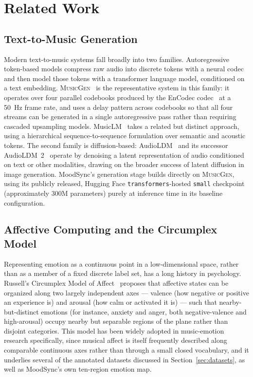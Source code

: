 \documentclass[11pt]{article}
\newcommand{\musicgen}{\textsc{MusicGen}}
\begin{document}
\section{Related Work}

\subsection{Text-to-Music Generation}

Modern text-to-music systems fall broadly into two families. Autoregressive token-based models compress raw audio into discrete tokens with a neural codec and then model those tokens with a transformer language model, conditioned on a text embedding. \musicgen{}~\cite{copet2023musicgen} is the representative system in this family: it operates over four parallel codebooks produced by the EnCodec codec~\cite{defossez2022encodec} at a 50~Hz frame rate, and uses a delay pattern across codebooks so that all four streams can be generated in a single autoregressive pass rather than requiring cascaded upsampling models. MusicLM~\cite{agostinelli2023musiclm} takes a related but distinct approach, using a hierarchical sequence-to-sequence formulation over semantic and acoustic tokens. The second family is diffusion-based: AudioLDM~\cite{liu2023audioldm} and its successor AudioLDM~2~\cite{liu2024audioldm2} operate by denoising a latent representation of audio conditioned on text or other modalities, drawing on the broader success of latent diffusion in image generation. MoodSync's generation stage builds directly on \musicgen{}, using its publicly released, Hugging Face \texttt{transformers}-hosted \texttt{small} checkpoint (approximately 300M parameters) purely at inference time in its baseline configuration.

\subsection{Affective Computing and the Circumplex Model}

Representing emotion as a continuous point in a low-dimensional space, rather than as a member of a fixed discrete label set, has a long history in psychology. Russell's Circumplex Model of Affect~\cite{russell1980circumplex} proposes that affective states can be organized along two largely independent axes --- valence (how negative or positive an experience is) and arousal (how calm or activated it is) --- such that nearby-but-distinct emotions (for instance, anxiety and anger, both negative-valence and high-arousal) occupy nearby but separable regions of the plane rather than disjoint categories. This model has been widely adopted in music-emotion research specifically, since musical affect is itself frequently described along comparable continuous axes rather than through a small closed vocabulary, and it underlies several of the annotated datasets discussed in Section~\ref{sec:datasets}, as well as MoodSync's own ten-region emotion map.
\end{document}
